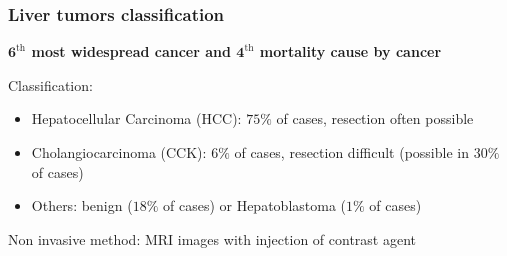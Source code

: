 \documentclass{beamer}
\begin{document}



    






\begin{frame}
    \frametitle{Liver tumors classification}
    \begin{center}
        \textbf{$\mathbf{6}^{\text{th}}$ most widespread cancer and $\mathbf{4}^{\text{th}}$ mortality cause by cancer}\\
    \end{center}
    Classification:
    \begin{itemize}
        \item Hepatocellular Carcinoma (HCC): $75\%$ of cases, resection often possible\\[10 pt]
        \item Cholangiocarcinoma (CCK): $6\%$ of cases, resection difficult (possible in $30\%$ of cases)\\[10 pt]
        \item Others: benign ($18 \%$ of cases) or Hepatoblastoma ($1 \%$ of cases)
    \end{itemize}

    Non invasive method: MRI images with injection of contrast agent
\end{frame}
\end{document}
